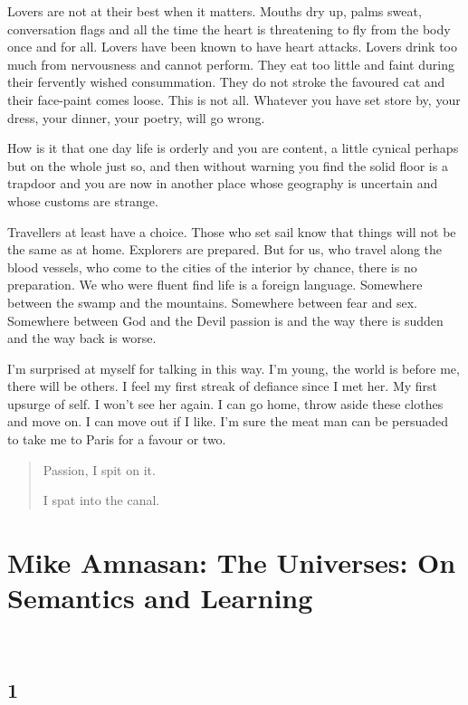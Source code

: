 \documentclass[
]{memoir}
\begin{document}
Lovers are not at their best when it matters. Mouths dry up, palms
sweat, conversation flags and all the time the heart is threatening to
fly from the body once and for all. Lovers have been known to have heart
attacks. Lovers drink too much from nervousness and cannot perform. They
eat too little and faint during their fervently wished consummation.
They do not stroke the favoured cat and their face-paint comes loose.
This is not all. Whatever you have set store by, your dress, your
dinner, your poetry, will go wrong.

How is it that one day life is orderly and you are content, a little
cynical perhaps but on the whole just so, and then without warning you
find the solid floor is a trapdoor and you are now in another place
whose geography is uncertain and whose customs are strange.

Travellers at least have a choice. Those who set sail know that things
will not be the same as at home. Explorers are prepared. But for us, who
travel along the blood vessels, who come to the cities of the interior
by chance, there is no preparation. We who were fluent find life is a
foreign language. Somewhere between the swamp and the mountains.
Somewhere between fear and sex. Somewhere between God and the Devil
passion is and the way there is sudden and the way back is worse.

I'm surprised at myself for talking in this way. I'm young, the world is
before me, there will be others. I feel my first streak of defiance
since I met her. My first upsurge of self. I won't see her again. I can
go home, throw aside these clothes and move on. I can move out if I
like. I'm sure the meat man can be persuaded to take me to Paris for a
favour or two.

\begin{quote}
Passion, I spit on it.

I spat into the canal.
\end{quote}

\hypertarget{mike-amnasan-the-universes-on-semantics-and-learning}{%
\chapter{Mike Amnasan: The Universes: On Semantics and
Learning}\label{mike-amnasan-the-universes-on-semantics-and-learning}}

~

\hypertarget{section-14}{%
\section*{1}\label{section-14}}
\end{document}
